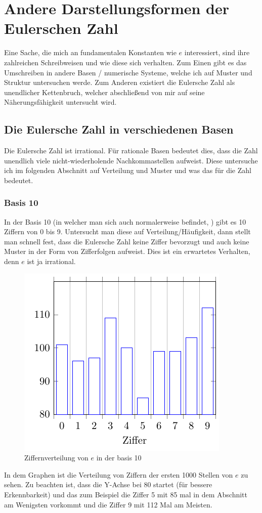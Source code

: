 \section{Andere Darstellungsformen der Eulerschen Zahl}
Eine Sache, die mich an fundamentalen Konstanten wie $e$ interessiert, sind ihre zahlreichen Schreibweisen und wie diese sich verhalten. Zum Einen gibt es das Umschreiben in andere Basen / numerische Systeme, welche ich auf Muster und Struktur untersuchen werde. Zum Anderen existiert die Eulersche Zahl als unendlicher Kettenbruch, welcher abschließend von mir auf seine Näherungsfähigkeit untersucht wird. \subsection{Die Eulersche Zahl in verschiedenen Basen}
Die Eulersche Zahl ist irrational. Für rationale Basen bedeutet dies, dass die Zahl unendlich viele nicht-wiederholende Nachkommastellen aufweist. Diese untersuche ich im folgenden Abschnitt auf Verteilung und Muster und was das für die Zahl bedeutet.
\subsubsection{Basis 10}
In der Basis 10 (in welcher man sich auch normalerweise befindet, ) gibt es 10 Ziffern von 0 bis 9. Untersucht man diese auf Verteilung/Häufigkeit, dann stellt man schnell fest, dass die Eulersche Zahl keine Ziffer bevorzugt und auch keine Muster in der Form von Zifferfolgen aufweist. Dies ist ein erwartetes Verhalten, denn $e$ ist ja irrational.
\begin{figure}[h]
  \includegraphics{medien2/basis10/basis10.pdf}
  \centering
  \caption{Ziffernverteilung von $e$ in der basis 10}
\end{figure}
\par In dem Graphen ist die Verteilung von Ziffern der ersten 1000 Stellen von $e$ zu sehen. Zu beachten ist, dass die Y-Achse bei 80 startet (für bessere Erkennbarkeit) und das zum Beispiel die Ziffer 5 mit 85 mal in dem Abschnitt am Wenigsten vorkommt und die Ziffer 9 mit 112 Mal am Meisten.

